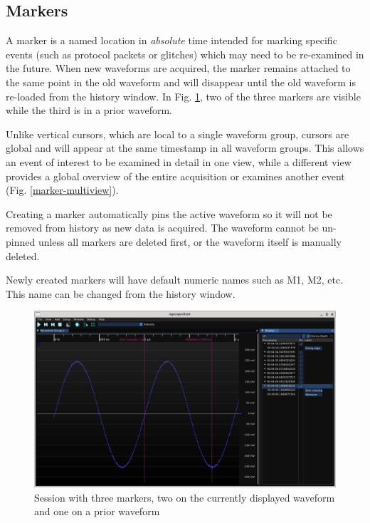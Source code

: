 \subsection{Markers}

A marker is a named location in \emph{absolute} time intended for marking specific events (such as protocol packets or
glitches) which may need to be re-examined in the future. When new waveforms are acquired, the marker remains attached
to the same point in the old waveform and will disappear until the old waveform is re-loaded from the history window.
In Fig. \ref{markers}, two of the three markers are visible while the third is in a prior waveform.

Unlike vertical cursors, which are local to a single waveform group, cursors are global and will appear at the same
timestamp in all waveform groups. This allows an event of interest to be examined in detail in one view, while a
different view provides a global overview of the entire acquisition or examines another event (Fig.
\ref{marker-multiview}).

Creating a marker automatically pins the active waveform so it will not be removed from history as new data is
acquired. The waveform cannot be un-pinned unless all markers are deleted first, or the waveform itself is manually
deleted.

Newly created markers will have default numeric names such as M1, M2, etc. This name can be changed from the history
window.

\begin{figure}[H]
\centering
\includegraphics[width=13cm]{ng-images/markers.png}
\caption{Session with three markers, two on the currently displayed waveform and one on a prior waveform}
\label{markers}
\end{figure}


